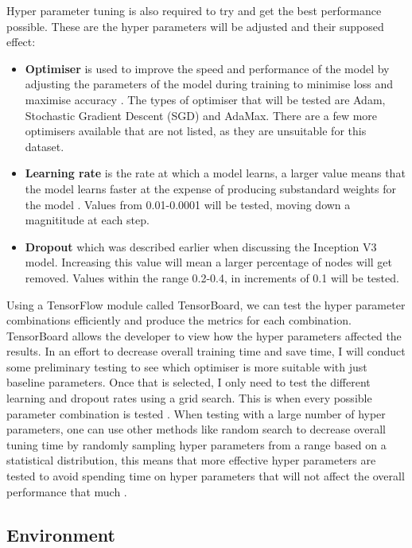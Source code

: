 \documentclass[12pt,a4paper]{report}
\begin{document}
\par

Hyper parameter tuning is also 
required to try and get the best performance possible. These are the hyper parameters will be adjusted and
their supposed effect:

\begin{itemize}
    \item \textbf{Optimiser} is used to improve the speed and performance of the model by adjusting the parameters of the 
    model during training to minimise loss and maximise accuracy \citep{maithani}. The types of optimiser that will be
    tested are Adam, Stochastic Gradient Descent (SGD) and AdaMax. There are a few more optimisers 
    available that are not listed, as they are unsuitable for this dataset.
    \item \textbf{Learning rate} is the rate at which a model learns, a larger value means that the model learns faster 
    at the expense of producing substandard weights for the model \citep{andreaperlato}. Values from 0.01-0.0001 will
    be tested, moving down a magnititude at each step. 
    \item \textbf{Dropout} which was described earlier when discussing the Inception V3 model. Increasing this value 
    will mean a larger percentage of nodes will get removed. Values within the range 0.2-0.4, in increments of 0.1 
    will be tested.
\end{itemize}

Using a TensorFlow module called TensorBoard, we can test the hyper parameter combinations efficiently and produce the 
metrics for each combination. TensorBoard allows the developer to view how the hyper parameters affected the results. 
In an effort to decrease overall training time and save time, I will conduct some preliminary testing to see which 
optimiser is more suitable with just baseline parameters. Once that is selected, I only need to test the different 
learning and dropout rates using a grid search. This is when every possible parameter combination is tested 
\citep{gridsearch}. 
When testing with a 
large number of hyper parameters, one can use other methods like random search to decrease overall tuning time by 
randomly sampling hyper parameters from a range based on a statistical distribution, this means that more effective 
hyper parameters are tested to avoid spending time on hyper parameters that will not affect the overall performance that
much \citep{sayak}. 

\subsection{Environment}
\end{document}
